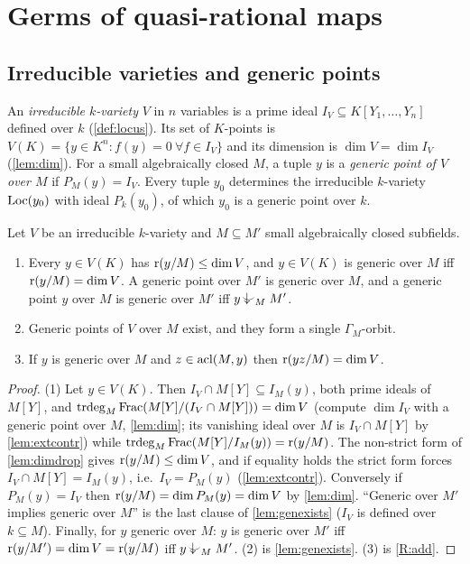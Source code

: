 \section{Germs of quasi-rational maps}
\label{sec:germs}

\subsection{Irreducible varieties and generic points}

\begin{definition}\label{def:variety}
An \emph{irreducible $k$-variety} $V$ in $n$ variables is a prime ideal
$I_V\subseteq K[Y_1,\dots,Y_n]$ defined over $k$ (\cref{def:locus}).  Its set of
$K$-points is $V(K)=\{y\in K^n: f(y)=0\ \forall f\in I_V\}$ and its dimension is
$\dim V=\dim I_V$ (\cref{lem:dim}).  For a small algebraically closed $M$, a tuple
$y$ is a \emph{generic point of $V$ over $M$} if $P_M(y)=I_V$.  Every tuple $y_0$
determines the irreducible $k$-variety $\operatorname{Loc}(y_0)$ with ideal $P_k(y_0)$, of which
$y_0$ is a generic point over $k$.
\end{definition}

\begin{lemma}\label{lem:generic-char}
Let $V$ be an irreducible $k$-variety and $M\subseteq M'$ small algebraically closed
subfields.
\begin{enumerate}[nosep]
\item Every $y\in V(K)$ has $\operatorname{r}(y/M)\le\dim V$, and $y\in V(K)$ is generic over $M$
  iff $\operatorname{r}(y/M)=\dim V$.  A generic point over $M'$ is generic over $M$, and a generic
  point $y$ over $M$ is generic over $M'$ iff $y\ind{M}M'$.
\item Generic points of $V$ over $M$ exist, and they form a single $\Gamma_M$-orbit.
\item If $y$ is generic over $M$ and $z\in\operatorname{acl}(M,y)$ then $\operatorname{r}(yz/M)=\dim V$.
\end{enumerate}
\end{lemma}
\begin{proof}
(1) Let $y\in V(K)$.  Then $I_V\cap M[Y]\subseteq I_M(y)$, both prime ideals of $M[Y]$,
and $\operatorname{trdeg}_M\operatorname{Frac}(M[Y]/(I_V\cap M[Y]))=\dim V$ (compute $\dim I_V$ with a
generic point over $M$, \cref{lem:dim}; its vanishing ideal over $M$ is $I_V\cap M[Y]$ by
\cref{lem:extcontr}) while $\operatorname{trdeg}_M\operatorname{Frac}(M[Y]/I_M(y))=\operatorname{r}(y/M)$.  The
non-strict form of \cref{lem:dimdrop} gives $\operatorname{r}(y/M)\le\dim V$, and if equality holds
the strict form forces $I_V\cap M[Y]=I_M(y)$, i.e.\ $I_V=P_M(y)$ (\cref{lem:extcontr}).
Conversely if $P_M(y)=I_V$ then $\operatorname{r}(y/M)=\dim P_M(y)=\dim V$ by \cref{lem:dim}.
``Generic over $M'$ implies generic over $M$'' is the last clause of \cref{lem:genexists}
($I_V$ is defined over $k\subseteq M$).  Finally, for $y$ generic over $M$: $y$ is
generic over $M'$ iff $\operatorname{r}(y/M')=\dim V=\operatorname{r}(y/M)$ iff $y\ind{M}M'$.
(2) is \cref{lem:genexists}.  (3) is \ref{R:add}.
\end{proof}

